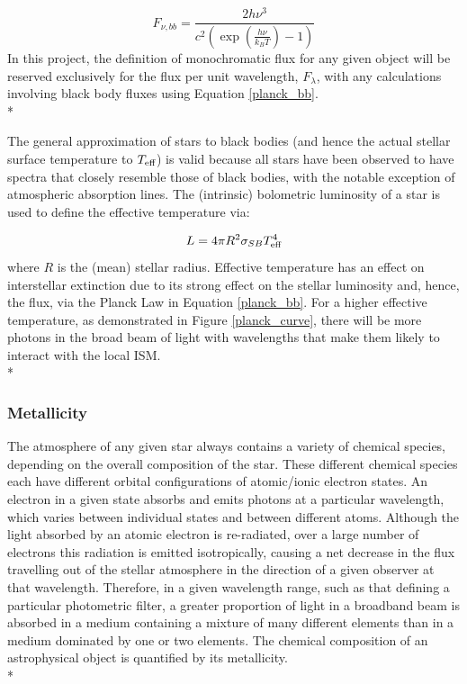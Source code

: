 \documentclass[12pt, a4paper]{report}
\begin{document}
\begin{equation}
F_{\nu,bb} = \frac{2h\nu^{3}}{c^{2}\left(\exp\left({\frac{h\nu}{k_{B}T}}\right) - 1\right)}
\label{planck_bb_freq}
\end{equation}
In this project, the definition of monochromatic flux for any given object will be reserved exclusively for the flux per unit wavelength, $F_{\lambda}$, with any calculations involving black body fluxes using Equation \ref{planck_bb}. \\*

The general approximation of stars to black bodies (and hence the actual stellar surface temperature to $T_{\textnormal{eff}}$) is valid because all stars have been observed to have spectra that closely resemble those of black bodies, with the notable exception of atmospheric absorption lines. The (intrinsic) bolometric luminosity of a star is used to define the effective temperature via:

\begin{equation}
L = 4 \pi R^{2} \sigma_{SB} T_{\textnormal{eff}}^{4}
\label{Teff_def}
\end{equation}
where $R$ is the (mean) stellar radius. Effective temperature has an effect on interstellar extinction due to its strong effect on the stellar luminosity and, hence, the flux, via the Planck Law in Equation \ref{planck_bb}. For a higher effective temperature, as demonstrated in Figure \ref{planck_curve}, there will be more photons in the broad beam of light with wavelengths that make them likely to interact with the local ISM. \\*

\subsubsection{Metallicity}

The atmosphere of any given star always contains a variety of chemical species, depending on the overall composition of the star. These different chemical species each have different orbital configurations of atomic/ionic electron states. An electron in a given state absorbs and emits photons at a particular wavelength, which varies between individual states and between different atoms. Although the light absorbed by an atomic electron is re-radiated, over a large number of electrons this radiation is emitted isotropically, causing a net decrease in the flux travelling out of the stellar atmosphere in the direction of a given observer at that wavelength. Therefore, in a given wavelength range, such as that defining a particular photometric filter, a greater proportion of light in a broadband beam is absorbed in a medium containing a mixture of many different elements than in a medium dominated by one or two elements. The chemical composition of an astrophysical object is quantified by its metallicity.\\*
\end{document}
